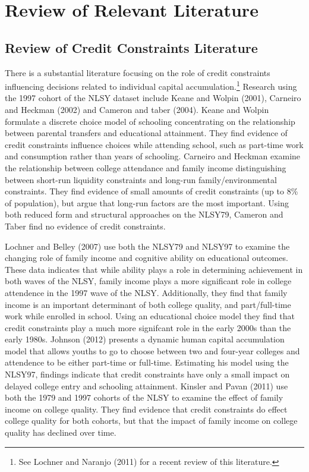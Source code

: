 \documentclass[letterpaper,12pt]{article}
\begin{document}
\section{Review of Relevant Literature}

\subsection{Review of Credit Constraints Literature}

There is a substantial literature focusing on the role of credit constraints influencing decisions related to individual capital accumulation.\footnote{See Lochner and Naranjo (2011) for a recent review of this literature.} Research using the 1997 cohort of the NLSY dataset include Keane and Wolpin (2001), Carneiro and Heckman (2002) and Cameron and taber (2004). Keane and Wolpin formulate a discrete choice model of schooling concentrating on the relationship between parental transfers and educational attainment. They find evidence of credit constraints influence choices while attending school, such as part-time work and consumption rather than years of schooling. Carneiro and Heckman examine the relationship between college attendance and family income distinguishing between short-run liquidity constraints and long-run family/environmental constraints. They find evidence of small amounts of credit constraints (up to 8\% of population), but argue that long-run factors are the most important. Using both reduced form and structural approaches on the NLSY79, Cameron and Taber find no evidence of credit constraints. 

Lochner and Belley (2007) use both the NLSY79 and NLSY97 to examine the changing role of family income and cognitive ability on educational outcomes. These data indicates that while ability plays a role in determining achievement in both waves of the NLSY, family income plays a more significant role in college attendence in the 1997 wave of the NLSY. Additionally, they find that family income is an important determinant of both college quality, and part/full-time work while enrolled in school. Using an educational choice model they find that credit constraints play a much more signifcant role in the early 2000s than the early 1980s. Johnson (2012) presents a dynamic human capital accumulation model that allows youths to go to choose between two and four-year colleges and attendence to be either part-time or full-time. Estimating his model using the NLSY97, findings indicate that credit constraints have only a small impact on delayed college entry and schooling attainment. Kinsler and Pavan (2011) use both the 1979 and 1997 cohorts of the NLSY to examine the effect of family income on college quality. They find evidence that credit constraints do effect college quality for both cohorts, but that the impact of family income on college quality has declined over time. 
\end{document}
